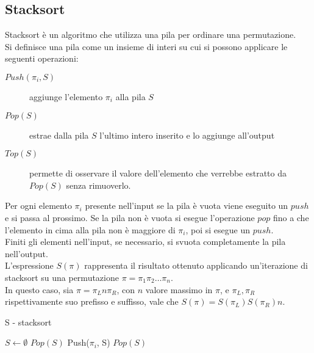 \subsection*{Stacksort}
Stacksort \`e un algoritmo che utilizza una pila per ordinare una permutazione.\\ 
Si definisce una pila come un insieme di interi su cui si possono applicare le seguenti operazioni:
\begin{description}
   \item[$Push(\pi_i, S)$] aggiunge l'elemento $\pi_i$ alla pila $S$
   \item[$Pop(S)$] estrae dalla pila $S$ l'ultimo intero inserito e lo aggiunge all'output
   \item[$Top(S)$] permette di osservare il valore dell'elemento che verrebbe estratto da $Pop(S)$ senza rimuoverlo.
\end{description}
Per ogni elemento $\pi_i$ presente nell'input se la pila \`e vuota viene eseguito un $push$ e si passa al prossimo. Se la pila non \`e vuota si esegue l'operazione $pop$ fino a che l'elemento in cima alla pila non \`e maggiore di $\pi_i$, poi si esegue un $push$.\\
Finiti gli elementi nell'input, se necessario, si svuota completamente la pila nell'output.\cite{limbrief}\\
L'espressione $S(\pi)$ rappresenta il risultato ottenuto applicando un'iterazione di stacksort su una permutazione $\pi = \pi_1\pi_2\dots\pi_n$.\\
In questo caso, sia $\pi = \pi_Ln\pi_R$, con $n$ valore massimo in $\pi$, e $\pi_L, \pi_R$ rispettivamente suo prefisso e suffisso, vale che $S(\pi)=S(\pi_L)S(\pi_R)n$.
\begin{algorithm}[H]
   \caption{S - stacksort}
\begin{algorithmic}[1]
\State $S\leftarrow\emptyset$
         \State $Pop(S)$
      \EndWhile
      \State Push($\pi_i$, S)
   \EndFor
      \State $Pop(S)$
   \EndWhile
\end{algorithmic}
\end{algorithm}
